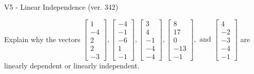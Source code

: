 \begin{exercise}
  \begin{exerciseTitle}V5 - Linear Independence (ver. 342)\end{exerciseTitle}
  \begin{exerciseStatement}
    Explain why the vectors \(\left[\begin{array}{r}
1 \\
-4 \\
2 \\
2 \\
-3
\end{array}\right] , \left[\begin{array}{r}
-4 \\
-1 \\
-6 \\
1 \\
-1
\end{array}\right] , \left[\begin{array}{r}
3 \\
4 \\
-1 \\
-4 \\
-4
\end{array}\right] , \left[\begin{array}{r}
8 \\
17 \\
0 \\
-13 \\
-1
\end{array}\right] , \text{ and } \left[\begin{array}{r}
4 \\
-2 \\
-3 \\
-4 \\
-1
\end{array}\right]\) are linearly dependent or linearly independent.	



\end{exerciseStatement}
\end{exercise}

